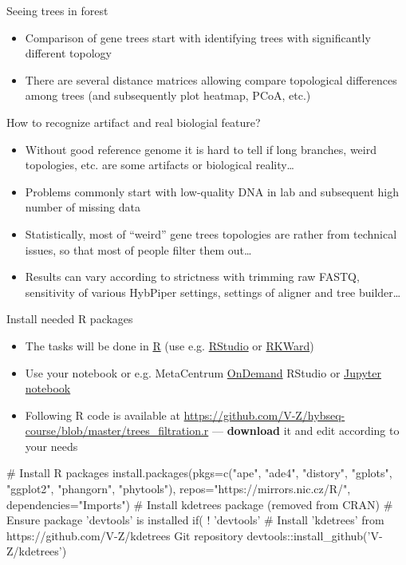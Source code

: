 \documentclass[compress,  xelatex, 11pt, xcolor=x11names, aspectratio=169,
	hyperref={
		bookmarks=true,
		unicode=true,
		colorlinks=true,
		pdftitle={HybSeq course},
		plainpages=false,
		pdfauthor={Vojtech Zeisek},
		pdfsubject={Practical processing of HybSeq target enrichment sequencing data on computing grids like MetaCentrum},
		pdfcreator={XeLaTeX},
		pdfkeywords={BASH, command line, GNU, HybSeq, Linux, MetaCentrum, sequencing shell, target enrichment},
		linkcolor=Turquoise4, %
		anchorcolor=DodgerBlue4, %
		citecolor=DodgerBlue4, %
		filecolor=DodgerBlue4, %
		menucolor=Tan4, %
		urlcolor=DarkOliveGreen4 %
		},
	url={hyphens, lowtilde} %
	]{beamer}
\renewcommand{\alert}[1]{\textcolor{OrangeRed3}{#1}}
\begin{document}
\begin{frame}{Seeing trees in forest}
	\begin{itemize}
		\item Comparison of gene trees start with identifying trees with significantly different topology
		\item There are several distance matrices allowing compare topological differences among trees (and subsequently plot heatmap, PCoA, etc.)
	\end{itemize}
	\begin{block}{How to recognize artifact and real biologial feature?}
		\begin{itemize}
			\item Without good reference genome it is hard to tell if long branches, weird topologies, etc. are some artifacts or biological reality\ldots
			\item Problems commonly start with low-quality DNA in lab and subsequent high number of missing data
			\item Statistically, most of \enquote{weird} gene trees topologies are rather from technical issues, so that most of people filter them out\ldots
			\item Results can vary according to strictness with trimming raw FASTQ, sensitivity of various HybPiper settings, settings of aligner and tree builder\ldots
		\end{itemize}
	\end{block}
\end{frame}

\begin{frame}[fragile]{Install needed R packages}
	\begin{itemize}
		\item The tasks will be done in \href{https://www.r-project.org/}{R} (use e.g. \href{https://posit.co/products/open-source/rstudio/}{RStudio} or \href{https://rkward.kde.org/}{RKWard})
		\item Use your notebook or e.g. MetaCentrum \href{https://docs.metacentrum.cz/software/ondemand/}{OnDemand} RStudio or \href{https://docs.metacentrum.cz/related/jupyter/}{Jupyter notebook}
		\item Following R code is available at \url{https://github.com/V-Z/hybseq-course/blob/master/trees_filtration.r} --- \alert{\textbf{download} it and edit} according to your needs
	\end{itemize}
	\begin{spluscode}
    # Install R packages
    install.packages(pkgs=c("ape", "ade4", "distory", "gplots", "ggplot2",
      "phangorn", "phytools"), repos="https://mirrors.nic.cz/R/",
      dependencies="Imports")
    # Install kdetrees package (removed from CRAN)
    # Ensure package 'devtools' is installed
    if( ! 'devtools' %
    # Install 'kdetrees' from https://github.com/V-Z/kdetrees Git repository
    devtools::install_github('V-Z/kdetrees')
	\end{spluscode}
\end{frame}
\end{document}
